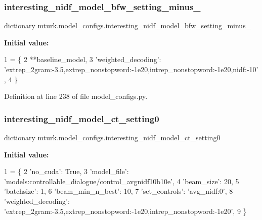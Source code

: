 \subsubsection{\texorpdfstring{interesting\+\_\+nidf\+\_\+model\+\_\+bfw\+\_\+setting\+\_\+minus\+\_}{interesting\_nidf\_model\_bfw\_setting\_minus\_10}}
{\footnotesize\ttfamily dictionary mturk.\+model\+\_\+configs.\+interesting\+\_\+nidf\+\_\+model\+\_\+bfw\+\_\+setting\+\_\+minus\+\_}

{\bfseries Initial value\+:}
\begin{DoxyCode}
1 =  \{
2     **baseline\_model,
3     \textcolor{stringliteral}{'weighted\_decoding'}: \textcolor{stringliteral}{'extrep\_2gram:-3.5,extrep\_nonstopword:-1e20,intrep\_nonstopword:-1e20,nidf:-10'},
4 \}
\end{DoxyCode}


Definition at line 238 of file model\+\_\+configs.\+py.

\mbox{\label{namespacemturk_1_1model__configs_a367f6f7e45eb74303a294767ea4818fa}} 
\subsubsection{\texorpdfstring{interesting\+\_\+nidf\+\_\+model\+\_\+ct\+\_\+setting0}{interesting\_nidf\_model\_ct\_setting0}}
{\footnotesize\ttfamily dictionary mturk.\+model\+\_\+configs.\+interesting\+\_\+nidf\+\_\+model\+\_\+ct\+\_\+setting0}

{\bfseries Initial value\+:}
\begin{DoxyCode}
1 =  \{
2     \textcolor{stringliteral}{'no\_cuda'}: \textcolor{keyword}{True},
3     \textcolor{stringliteral}{'model\_file'}: \textcolor{stringliteral}{'models:controllable\_dialogue/control\_avgnidf10b10e'},
4     \textcolor{stringliteral}{'beam\_size'}: 20,
5     \textcolor{stringliteral}{'batchsize'}: 1,
6     \textcolor{stringliteral}{'beam\_min\_n\_best'}: 10,
7     \textcolor{stringliteral}{'set\_controls'}: \textcolor{stringliteral}{'avg\_nidf:0'},
8     \textcolor{stringliteral}{'weighted\_decoding'}: \textcolor{stringliteral}{'extrep\_2gram:-3.5,extrep\_nonstopword:-1e20,intrep\_nonstopword:-1e20'},
9 \}
\end{DoxyCode}


